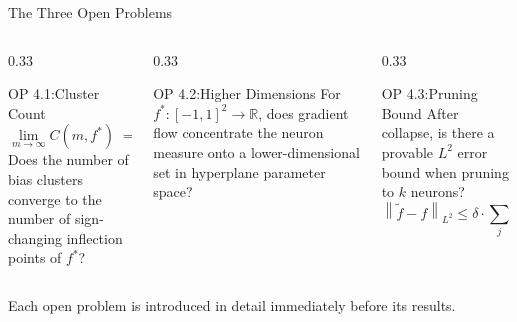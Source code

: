 \documentclass[aspectratio=169, 10pt]{beamer}
\newcommand{\fstar}{f^\ast}
\newcommand{\ftilde}{\tilde{f}}
\newcommand{\norm}[1]{\left\|#1\right\|}
\newcommand{\abs}[1]{\left|#1\right|}
\begin{document}
\begin{frame}{The Three Open Problems}
  \begin{columns}[T]
    \begin{column}{0.33\textwidth}
      \begin{block}{OP 4.1:Cluster Count}
        \small
        \[
          \lim_{m \to \infty} C(m,\fstar) \;=\; k
        \]
        Does the number of bias clusters converge
        to the number of sign-changing inflection
        points of $\fstar$?
      \end{block}
    \end{column}
    \begin{column}{0.33\textwidth}
      \begin{block}{OP 4.2:Higher Dimensions}
        \small
        For $\fstar : [-1,1]^2 \to \mathbb{R}$,
        does gradient flow concentrate the neuron
        measure onto a lower-dimensional set in
        hyperplane parameter space?
      \end{block}
    \end{column}
    \begin{column}{0.33\textwidth}
      \begin{block}{OP 4.3:Pruning Bound}
        \small
        After collapse, is there a provable $L^2$
        error bound when pruning to $k$ neurons?
        \[
          \norm{\ftilde - f}_{L^2}
          \leq \delta \cdot \sum_{j} \abs{a_j}
        \]
      \end{block}
    \end{column}
  \end{columns}

  \vspace{0.6em}
  \begin{center}
    \small
    Each open problem is introduced in detail immediately before its results.
  \end{center}
\end{frame}
\end{document}
